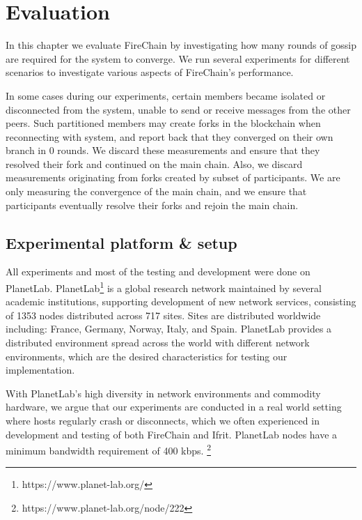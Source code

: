 \documentclass[USenglish]{uit-thesis}
\begin{document}
\chapter{Evaluation}\label{chap:evaluation}
In this chapter we evaluate FireChain by investigating how many rounds of gossip are required for the system to converge.
We run several experiments for different scenarios to investigate various aspects of FireChain's performance.

In some cases during our experiments, certain members became isolated or disconnected from the system, unable to send or receive messages from the other peers.
Such partitioned members may create forks in the blockchain when reconnecting with system, and report back that they converged on their own branch in 0 rounds.
We discard these measurements and ensure that they resolved their fork and continued on the main chain.
Also, we discard measurements originating from forks created by subset of participants.
We are only measuring the convergence of the main chain, and we ensure that participants eventually resolve their forks and rejoin the main chain. 

\newpage
\section{Experimental platform \& setup}
All experiments and most of the testing and development were done on PlanetLab. 
PlanetLab\footnote{https://www.planet-lab.org/} is a global research network maintained by several academic institutions, supporting development of new network services, consisting of 1353 nodes distributed across 717 sites.
Sites are distributed worldwide including: France, Germany, Norway, Italy, and Spain. 
PlanetLab provides a distributed environment spread across the world with different network environments, which are the desired characteristics for testing our implementation.

With PlanetLab's high diversity in network environments and commodity hardware, we argue that our experiments are conducted in a real world setting where hosts regularly crash or disconnects, which we often experienced in development and testing of both FireChain and Ifrit.
PlanetLab nodes have a minimum bandwidth requirement of 400 \gls{kbps}. \footnote{https://www.planet-lab.org/node/222}
\end{document}
